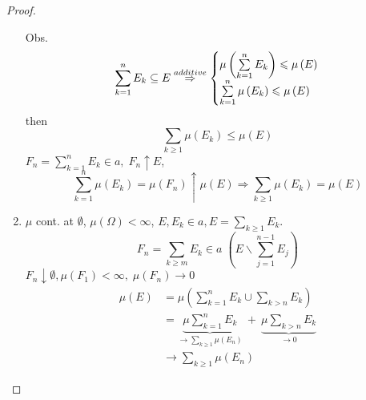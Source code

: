 \begin{proof}
\begin{enumerate}
		Obs.
		\begin{equation}
		\sum\limits_{k = 1}^n {{E_k}}  \subseteq E \stackrel{additive}{\Rightarrow} \left\{ \begin{matrix} 
		\mu \left( {\sum\limits_{k = 1}^n {{E_k}} } \right) \leqslant \mu \left( E \right) \hfill \cr 
		\sum\limits_{k = 1}^n {\mu \left( {{E_k}} \right) \leqslant \mu \left( E \right)}  \hfill \cr 
		\end{matrix}  \right.
		\label{eq3.9}
		\end{equation}
		then
		\begin{equation}
		\sum\limits_{k \geqslant 1} {\mu \left( {{E_k}} \right)}  \leqslant \mu \left( E \right)
		\label{eq3.10}
		\end{equation}
		${F_n} = \sum\limits_{k = 1}^n {{E_k}}  \in a,\;{F_n} \uparrow E$, 
		\begin{equation}
		\sum\limits_{k = 1}^n {\mu \left( {{E_k}} \right)}  = \mu \left( {{F_n}} \right) \uparrow \mu \left( E \right) \Rightarrow \sum\limits_{k \geqslant 1} {\mu \left( {{E_k}} \right)}  = \mu \left( E \right)
		\label{eq3.11}
		\end{equation}
		\item $ \mu $ cont. at $ \emptyset $, $ \mu\left(\Omega\right) < \infty $, $ E,E_{k} \in a, E = \sum\limits_{k \geqslant 1} {{E_k}}. $ 
		\begin{equation}
		{F_n} = \sum\limits_{k \geqslant m} {{E_k}}  \in a\;\left( {E\backslash \sum\limits_{j = 1}^{n - 1} {{E_j}} } \right)
		\label{eq3.12}
		\end{equation}
		${F_n} \downarrow \emptyset ,\mu \left( {{F_1}} \right) < \infty ,\;\mu \left( {{F_n}} \right) \to 0$
		\begin{equation}
		\begin{split}
		\mu \left( E \right) & = \mu \left( {\sum\limits_{k = 1}^n {{E_k} \cup \sum\limits_{k > n} {{E_k}} } } \right)\\
							 & =  \underbrace {\mu \sum\limits_{k = 1}^n {{E_k}  } }_{ \to \sum\limits_{k \geqslant 1} {\mu \left( {{E_n}} \right)} } \ + \ \underbrace {\mu \sum\limits_{k > n} {{E_k}} }_{ \to 0}\\
							 & \to \sum\limits_{k \geqslant 1} {\mu \left( {{E_n}} \right)} 
		\end{split}
		\end{equation}
		\label{eq3.13}
	\end{enumerate}
\end{proof}


